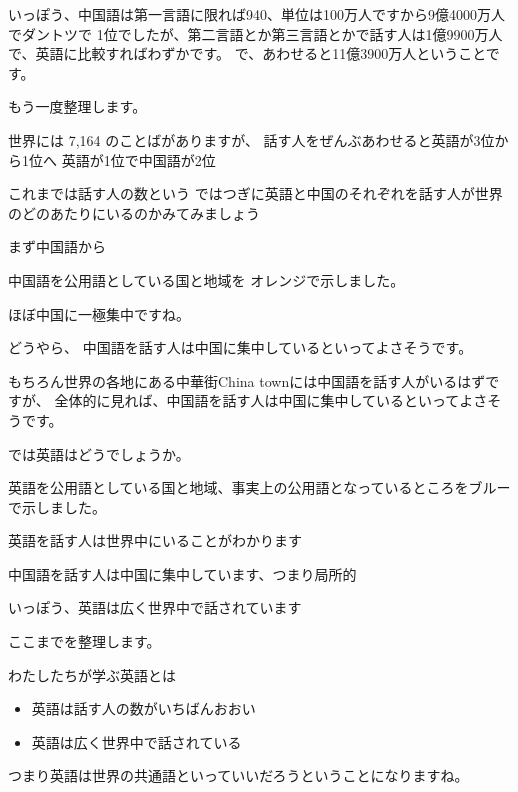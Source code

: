 \documentclass[12pt]{jlreq}
\begin{document}
いっぽう、中国語は第一言語に限れば940、単位は100万人ですから9億4000万人でダントツで
1位でしたが、第二言語とか第三言語とかで話す人は1億9900万人で、英語に比較すればわずかです。
で、あわせると11億3900万人ということです。

\hrulefill

もう一度整理します。

世界には 7,164 のことばがありますが、
話す人をぜんぶあわせると英語が3位から1位へ
英語が1位で中国語が2位

\hrulefill

これまでは話す人の数という
ではつぎに英語と中国のそれぞれを話す人が世界のどのあたりにいるのかみてみましょう



まず中国語から

\hrulefill

中国語を公用語としている国と地域を
オレンジで示しました。

ほぼ中国に一極集中ですね。

\hrulefill

どうやら、
中国語を話す人は中国に集中しているといってよさそうです。

もちろん世界の各地にある中華街China townには中国語を話す人がいるはずですが、
全体的に見れば、中国語を話す人は中国に集中しているといってよさそうです。

では英語はどうでしょうか。

\hrulefill

英語を公用語としている国と地域、事実上の公用語となっているところをブルーで示しました。

\hrulefill

英語を話す人は世界中にいることがわかります

\hrulefill

中国語を話す人は中国に集中しています、つまり局所的

いっぽう、英語は広く世界中で話されています

\hrulefill

ここまでを整理します。

わたしたちが学ぶ英語とは

\begin{itemize}
 \item 英語は話す人の数がいちばんおおい

 \item 英語は広く世界中で話されている
\end{itemize}

 

つまり英語は世界の共通語といっていいだろうということになりますね。
\end{document}
